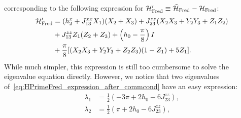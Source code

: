 corresponding to the following expression for ${\mathcal{H}}'_{\operatorname{Fred}}\equiv\tilde{{\mathcal{H}}}_{\operatorname{Fred}}-{\mathcal{H}}_{\operatorname{Fred}}$:
\begin{equation}
\begin{aligned}
    {\mathcal{H}}'_{\operatorname{Fred}} &=
    (h_2^x + J_{13}^{xx} X_1)(X_2+X_3)
    + J_{23}^{zz} (X_2 X_3 + Y_2 Y_3 + Z_1 Z_2) \\
    &+ J_{13}^{zz} Z_1 (Z_2 + Z_3)
    + \left(h_0 - \frac{\pi}{8}\right) I \\
    &+ \frac{\pi}{8} [
        (X_2 X_3 + Y_2 Y_3 + Z_2 Z_3) (1 - Z_1)
        + 5 Z_1
    ].
\end{aligned}
\label{eq:HPrimeFred_expression_after_commcond}
\end{equation}
While much simpler, this expression is still too cumbersome to solve the eigenvalue equation directly.
However, we notice that two eigenvalues of~\cref{eq:HPrimeFred_expression_after_commcond} have an easy expression:
\begin{equation}
\begin{aligned}
    \lambda_1 &= \frac{1}{2}( -3\pi + 2h_0 - 6J_{23}^{zz}), \\
    \lambda_2 &= \frac{1}{2}( \pi   + 2h_0 - 6J_{23}^{zz}),
\end{aligned}
\label{eq:fredkin_first_two_nice_eigenvalues}
\end{equation}

